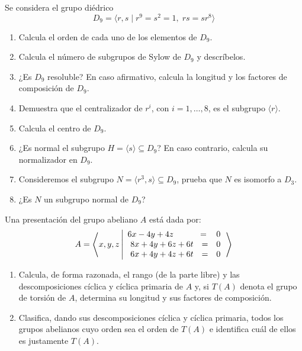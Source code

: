 \documentclass[12pt]{article}
\begin{document}
    \begin{ejercicio}[3 puntos]
        Se considera el grupo diédrico $$D_9 = \langle r, s \mid r^9 = s^2 = 1,\; rs = sr^{8} \rangle$$
        \begin{enumerate}[label=(\alph*)]
            \item Calcula el orden de cada uno de los elementos de $D_9$.
            \item Calcula el número de subgrupos de Sylow de $D_9$ y descríbelos.
            \item ¿Es $D_9$ resoluble? En caso afirmativo, calcula la longitud y los factores de composición de $D_9$.
            \item Demuestra que el centralizador de $r^i$, con $i = 1,\dots,8$, es el subgrupo $\langle r \rangle$.
            \item Calcula el centro de $D_9$.
            \item ¿Es normal el subgrupo $H = \langle s \rangle \subseteq D_9$? En caso contrario, calcula su normalizador en $D_9$.
            \item Consideremos el subgrupo $N = \langle r^3, s \rangle \subseteq D_9$, prueba que $N$ es isomorfo a $D_3$.
            \item ¿Es $N$ un subgrupo normal de $D_9$?
        \end{enumerate}
    \end{ejercicio}

    \begin{ejercicio}[2 puntos]
        Una presentación del grupo abeliano $A$ está dada por:
        $$
            A = \left\langle x, y, z \left|\begin{array}{rcl}
                6x - 4y + 4z \hspace{0.85cm} &\phantom{+6t} \hspace{-0.8cm} = & 0 \\
                8x + 4y + 6z + 6t & = & 0 \\
                6x + 4y + 4z + 6t & = & 0
            \end{array}\right.\right\rangle
        $$
        \begin{enumerate}[label=(\alph*)]
            \item Calcula, de forma razonada, el rango (de la parte libre) y las descomposiciones cíclica y cíclica primaria de $A$ y, si $T(A)$ denota el grupo de torsión de $A$, determina su longitud y sus factores de composición.
            \item Clasifica, dando sus descomposiciones cíclica y cíclica primaria, todos los grupos abelianos cuyo orden sea el orden de $T(A)$ e identifica cuál de ellos es justamente $T(A)$.
        \end{enumerate}

    \end{ejercicio}
\end{document}
